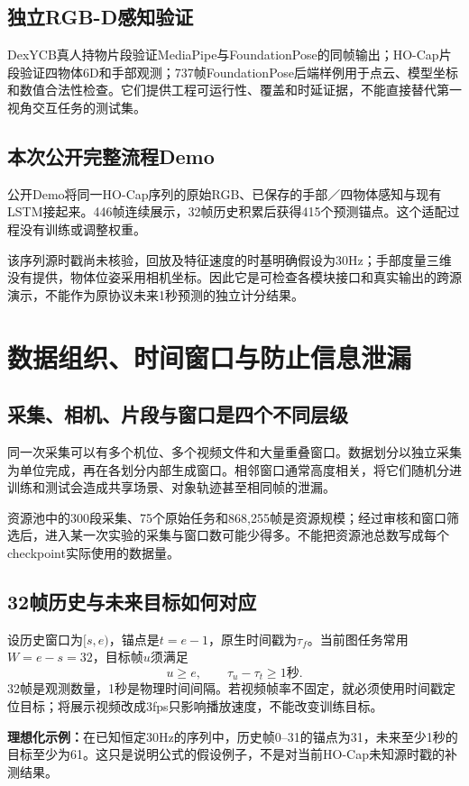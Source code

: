 \documentclass[11pt,a4paper,UTF8,fontset=fandol]{ctexart}
\begin{document}
\subsection{独立RGB-D感知验证}
DexYCB真人持物片段验证MediaPipe与FoundationPose的同帧输出；HO-Cap片段验证四物体6D和手部观测；737帧FoundationPose后端样例用于点云、模型坐标和数值合法性检查。它们提供工程可运行性、覆盖和时延证据，不能直接替代第一视角交互任务的测试集。

\subsection{本次公开完整流程Demo}
公开Demo将同一HO-Cap序列的原始RGB、已保存的手部／四物体感知与现有LSTM接起来。446帧连续展示，32帧历史积累后获得415个预测锚点。这个适配过程没有训练或调整权重。

该序列源时戳尚未核验，回放及特征速度的时基明确假设为30Hz；手部度量三维没有提供，物体位姿采用相机坐标。因此它是可检查各模块接口和真实输出的跨源演示，不能作为原协议未来1秒预测的独立计分结果。

\section{数据组织、时间窗口与防止信息泄漏}
\subsection{采集、相机、片段与窗口是四个不同层级}
同一次采集可以有多个机位、多个视频文件和大量重叠窗口。数据划分以独立采集为单位完成，再在各划分内部生成窗口。相邻窗口通常高度相关，将它们随机分进训练和测试会造成共享场景、对象轨迹甚至相同帧的泄漏。

资源池中的300段采集、75个原始任务和868,255帧是资源规模；经过审核和窗口筛选后，进入某一次实验的采集与窗口数可能少得多。不能把资源池总数写成每个checkpoint实际使用的数据量。

\subsection{32帧历史与未来目标如何对应}
设历史窗口为$[s,e)$，锚点是$t=e-1$，原生时间戳为$\tau_f$。当前图任务常用$W=e-s=32$，目标帧$u$须满足
\[
u\ge e,\qquad \tau_u-\tau_t\ge 1\text{秒}.
\]
32帧是观测数量，1秒是物理时间间隔。若视频帧率不固定，就必须使用时间戳定位目标；将展示视频改成3fps只影响播放速度，不能改变训练目标。

\textbf{理想化示例：}在已知恒定30Hz的序列中，历史帧0--31的锚点为31，未来至少1秒的目标至少为61。这只是说明公式的假设例子，不是对当前HO-Cap未知源时戳的补测结果。
\end{document}
